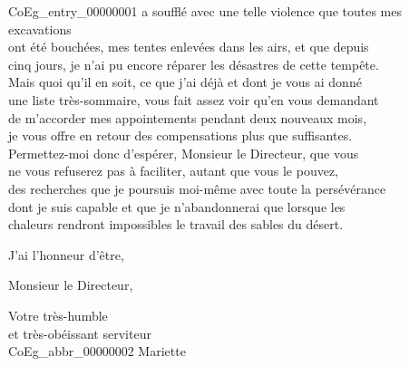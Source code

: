 \documentclass{book}
\begin{document}
\Gls{CoEg_entry_00000001} a soufflé avec une telle violence que toutes mes excavations\\
ont été bouchées, mes tentes enlevées dans les airs, et que depuis\\
cinq jours, je n’ai pu encore réparer les désastres de cette tempête.\\
\indent Mais quoi qu’il en soit, ce que j’ai déjà et dont je vous ai donné\\
une liste très-sommaire, vous fait assez voir qu’en vous demandant\\
de m’accorder mes appointements pendant deux nouveaux mois,\\
je vous offre en retour des compensations plus que suffisantes.\\
\indent Permettez-moi donc d’espérer, Monsieur le Directeur, que vous\\
ne vous refuserez pas à faciliter, autant que vous le pouvez,\\
des recherches que je poursuis moi-même avec toute la persévérance\\
dont je suis capable et que je n’abandonnerai que lorsque les\\
chaleurs rendront impossibles le travail des sables du désert.
\par J’ai l’honneur d’être,
\begin{center} Monsieur le Directeur,\end{center}
\begin{center} \hspace{5cm}Votre très-humble\\
\hspace{5cm}et très-obéissant serviteur\\
\hspace{5cm} \gls{CoEg_abbr_00000002} Mariette\end{center}
\hypertarget{CoEg_Mariette_1851-08-31}{}
\end{document}
